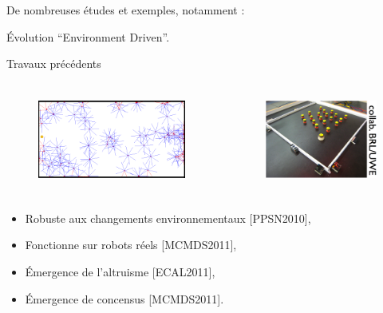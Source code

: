 \documentclass[8pt]{beamer}
\begin{document}
\begin{frame}
	De nombreuses études et exemples, notamment : \cite{bredeche11mcmds}

	Évolution ``Environment Driven''.
	
\end{frame}



\begin{frame}{Travaux précédents}
	\begin{columns}
		\begin{figure}%
			\includegraphics[width=\textwidth,height=3cm]{images/roborobo-setup-twosuns}
		\end{figure}
		\begin{figure}%
			\includegraphics[width=\textwidth,height=3cm]{images/medea-RealRobots}
		\end{figure}
	\end{columns}

	\vfill

	\begin{itemize}
		\item Robuste aux changements environnementaux {\small[PPSN2010]}, \nocite{bredeche11mcmds} 
			\vfil
		\item Fonctionne sur robots réels {\small[MCMDS2011]}, %
			\vfil
		\item \'{E}mergence de l'altruisme {\small[ECAL2011]},
			\vfil
		\item \'{E}mergence de concensus {\small[MCMDS2011]}.
	\end{itemize}


\end{frame}
\end{document}
